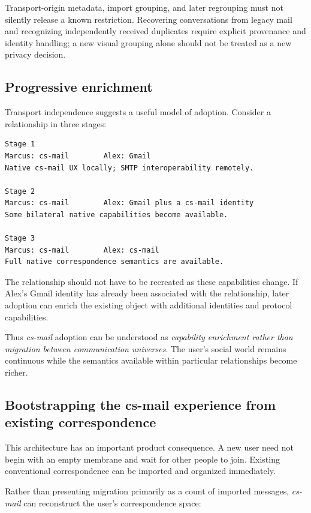 \documentclass[11pt]{article}
\newcommand{\csmail}{\textit{cs-mail}}
\begin{document}
Transport-origin metadata, import grouping, and later regrouping must not silently release a known restriction. Recovering conversations from legacy mail and recognizing independently received duplicates require explicit provenance and identity handling; a new visual grouping alone should not be treated as a new privacy decision.

\subsection*{Progressive enrichment}

Transport independence suggests a useful model of adoption. Consider a relationship in three stages:

\begin{Verbatim}[fontsize=\small]
Stage 1
Marcus: cs-mail        Alex: Gmail
Native cs-mail UX locally; SMTP interoperability remotely.

Stage 2
Marcus: cs-mail        Alex: Gmail plus a cs-mail identity
Some bilateral native capabilities become available.

Stage 3
Marcus: cs-mail        Alex: cs-mail
Full native correspondence semantics are available.
\end{Verbatim}

The relationship should not have to be recreated as these capabilities change. If Alex's Gmail identity has already been associated with the relationship, later adoption can enrich the existing object with additional identities and protocol capabilities.

Thus \csmail{} adoption can be understood as \emph{capability enrichment rather than migration between communication universes}. The user's social world remains continuous while the semantics available within particular relationships become richer.

\subsection*{Bootstrapping the cs-mail experience from existing correspondence}

This architecture has an important product consequence. A new user need not begin with an empty membrane and wait for other people to join. Existing conventional correspondence can be imported and organized immediately.

Rather than presenting migration primarily as a count of imported messages, \csmail{} can reconstruct the user's correspondence space:
\end{document}
